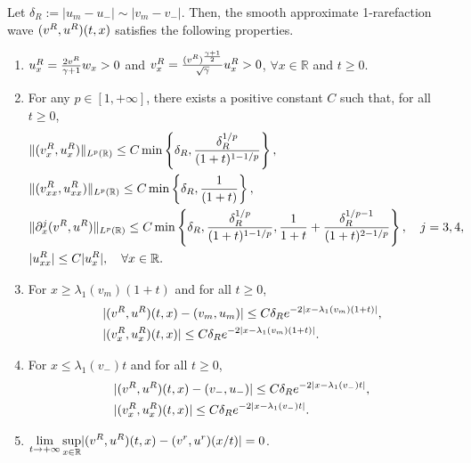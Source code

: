 \documentclass[11pt,reqno]{amsart}
\begin{document}
    \begin{lemma}\label{lem:rarefaction_property} Let $\delta_R :=|u_m-u_-| \sim |v_m-v_-|$. Then, the smooth approximate 1-rarefaction wave $(v^R, u^R)(t, x)$ satisfies the following properties. 
        \begin{enumerate}
            \item $u^R_x=\frac{2v^R}{\gamma+1}w_x>0$ and $v^R_x=\frac{(v^R)^{\frac{\gamma+1}{2}}}{\sqrt{\gamma}}u^R_x>0$, $\forall x \in \mathbb{R}$ and $t \ge 0.$
            \item For any $p \in [1,+\infty]$, there exists a positive constant $C$ such that, for all $t\ge0$,
            \begin{align*}
            &\|(v^R_x,u^R_x)\|_{L^p(\mathbb{R})} \le C \min \left\{\delta_R, \frac{\delta_R^{1/p}}{(1+t)^{1-1/p}} \right\}, \\
            &\|(v^R_{xx},u^R_{xx})\|_{L^p(\mathbb{R})} \le C \min \left\{\delta_R, \frac{1}{(1+t)} \right\}, \\
            &\|\partial_x^j(v^R,u^R)\|_{L^p(\mathbb{R})} \le C \min \left\{\delta_R, \frac{\delta_R^{1/p}}{(1+t)^{1-1/p}} ,\frac{1}{1+t}+\frac{\delta_R^{1/p-1}}{(1+t)^{2-1/p}}\right\}, \quad j = 3,4,\\
            &|u^R_{xx}| \le C |u^R_x|, \quad \forall x \in \mathbb{R}.
            \end{align*}
            \item For $x \ge \lambda_{1}(v_m)(1+t)$ and for all $t\ge0$,
            \begin{align*}
            &|(v^R,u^R)(t,x) -(v_m,u_m)| \le C \delta_R e^{-2|x-\lambda_{1}(v_m)(1+t)|} , \\
            &|(v^R_{x},u^R_{x})(t,x)| \le C \delta_R e^{-2|x-\lambda_{1}(v_m)(1+t)|}.
            \end{align*}
            \item For $x \le \lambda_{1}(v_-)t$ and for all $t\ge0$, 
            \begin{align*}
            &|(v^R,u^R)(t,x) -(v_-,u_-)| \le C \delta_R e^{-2|x-\lambda_{1}(v_-)t|} , \\
            &|(v^R_{x},u^R_{x})(t,x)| \le C \delta_R e^{-2|x-\lambda_{1}(v_-)t|}.
            \end{align*}
            \item $\displaystyle{\lim_{t \to +\infty}\sup_{x \in \mathbb{R}}}|(v^R,u^R)(t,x)-(v^r,u^r)(x/t)|=0$.
        \end{enumerate}
    \end{lemma}
    
\end{document}
